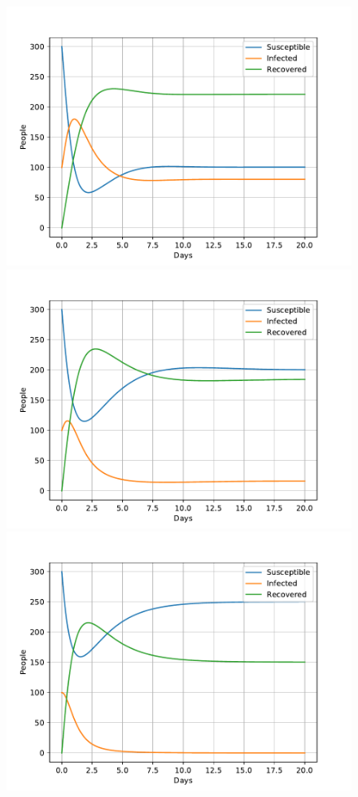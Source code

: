 \documentclass[a4paper]{article}
\begin{document}
\begin{figure}[!htb]
	\centering 
	\includegraphics[scale=0.56]{../plots/opp_e_fa.pdf}
	\includegraphics[scale=0.56]{../plots/opp_e_fb.pdf}	
	\includegraphics[scale=0.56]{../plots/opp_e_fc.pdf}

\end{figure}
\end{document}

